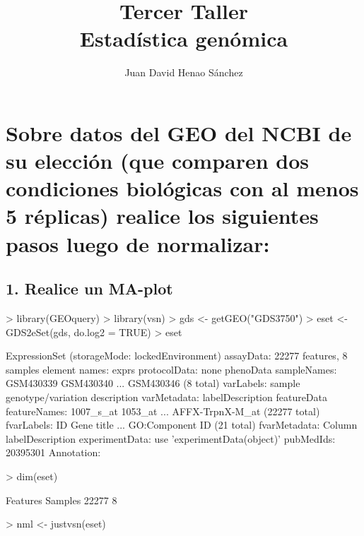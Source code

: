 \documentclass{article}
\title{Tercer Taller\\ Estadística genómica}
\author{Juan David Henao Sánchez}
\begin{document}


\maketitle

\section*{Sobre datos del GEO del NCBI de su elección (que comparen dos condiciones biológicas con al menos 5 réplicas) realice los siguientes pasos luego de normalizar:}
\subsection*{1. Realice un MA-plot}


\begin{Schunk}
\begin{Sinput}
> library(GEOquery)
> library(vsn)
> gds <- getGEO("GDS3750")
> eset <- GDS2eSet(gds, do.log2 = TRUE)
> eset
\end{Sinput}
\begin{Soutput}
ExpressionSet (storageMode: lockedEnvironment)
assayData: 22277 features, 8 samples 
  element names: exprs 
protocolData: none
phenoData
  sampleNames: GSM430339 GSM430340 ... GSM430346 (8 total)
  varLabels: sample genotype/variation description
  varMetadata: labelDescription
featureData
  featureNames: 1007_s_at 1053_at ... AFFX-TrpnX-M_at (22277 total)
  fvarLabels: ID Gene title ... GO:Component ID (21 total)
  fvarMetadata: Column labelDescription
experimentData: use 'experimentData(object)'
  pubMedIds: 20395301 
Annotation:  
\end{Soutput}
\begin{Sinput}
> dim(eset)
\end{Sinput}
\begin{Soutput}
Features  Samples 
   22277        8 
\end{Soutput}
\begin{Sinput}
> nml <- justvsn(eset)
\end{Sinput}
\end{Schunk}
\end{document}
